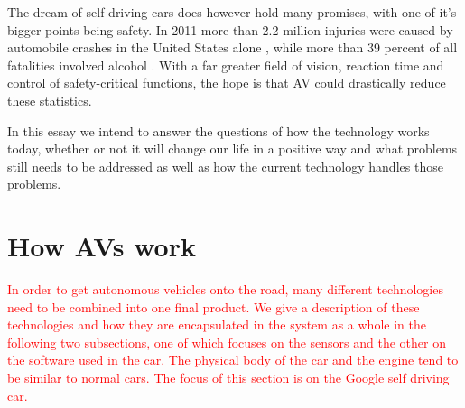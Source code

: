 \documentclass[11pt]{article}
\newcommand{\changed}[1]{\textcolor{red}{#1}}
\begin{document}
The dream of self-driving cars does however hold many promises, with one of it's bigger points being safety. In 2011 more than 2.2 million injuries were caused by automobile crashes in the United States alone \cite[p. 14]{Anderson2014rand}, while more than 39 percent of all fatalities involved alcohol \cite[p. 16]{Anderson2014rand}. With a far greater field of vision, reaction time and control of safety-critical functions, the hope is that AV could drastically reduce these statistics. 

In this essay we intend to answer the questions of how the technology works today, whether or not it will change our life in a positive way and what problems still needs to be addressed as well as how the current technology handles those problems.

\section{How AVs work}
\label{sec:howavswork}
\changed{In order to get autonomous vehicles onto the road, many different technologies need to be combined into one final product. We give a description of these technologies and how they are encapsulated in the system as a whole in the following two subsections, one of which focuses on the sensors and the other on the software used in the car. The physical body of the car and the engine tend to be similar to normal cars. The focus of this section is on the Google self driving car.}
\end{document}
